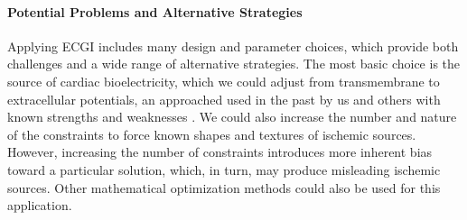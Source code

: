 
\paragraph{Potential Problems and Alternative Strategies} Applying ECGI
includes many design and parameter choices, which provide both challenges
and a wide range of alternative strategies. The most basic choice is the
source of cardiac bioelectricity, which we could adjust from transmembrane
to extracellular potentials, an approached used in the past by us and
others with known strengths and weaknesses \cite{RSM:Mac95,RSM:Ost97b}. We
could also increase the number and nature of the constraints to force known
shapes and textures of ischemic sources. However, increasing the number of
constraints introduces more inherent bias toward a particular solution,
which, in turn, may produce misleading ischemic sources. Other mathematical
optimization methods could also be used for this
application\cite{RSM:Ahm94,RSM:Bro96b,RSM:Ahm98,
  RSM:Gha2001,RSM:Ost92,RSM:Ost97c,RSM:Ram2003,RSM:Clu2018}.


